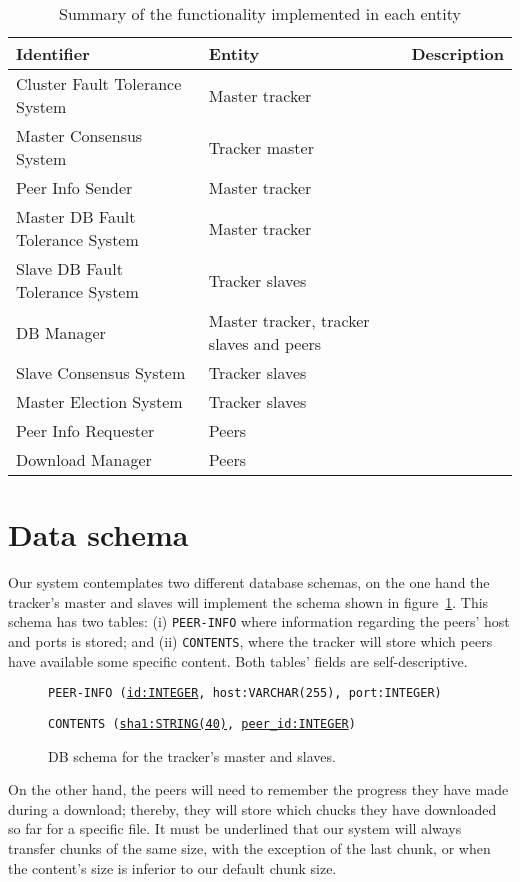 \documentclass[twoside,a4paper,10pt]{article}
\begin{document}
\begin{table}[h]
  \centering
  \begin{tabularx}{\linewidth}{X X l}
    Identifier & Entity & Description \\ \hline\hline
    Cluster Fault Tolerance System & Master tracker &  \\
    Master Consensus System & Tracker master &  \\
    Peer Info Sender & Master tracker &  \\
    Master DB Fault Tolerance System & Master tracker &  \\
    Slave DB Fault Tolerance System & Tracker slaves &  \\
    DB Manager & Master tracker, tracker slaves and peers &  \\
    Slave Consensus System & Tracker slaves &  \\
    Master Election System & Tracker slaves &  \\
    Peer Info Requester & Peers &  \\
    Download Manager & Peers &  \\
  \end{tabularx}
  \caption{\label{tab:fun-entities}Summary of the functionality
    implemented in each entity}
\end{table}
\section{Data schema}

Our system contemplates two different database schemas, on the one hand the
tracker's master and slaves will implement the schema shown in
figure~\ref{fig:schema-MS}. This schema has two tables: (i) \texttt{PEER-INFO}
where information regarding the peers' host and ports is stored; and (ii)
\texttt{CONTENTS}, where the tracker will store which peers have available some
specific content. Both tables' fields are self-descriptive.

\begin{figure}[h]
  
  \texttt{PEER-INFO (\underline{id:INTEGER}, host:VARCHAR(255), port:INTEGER)}
  
  \texttt{CONTENTS (\underline{sha1:STRING(40)}, \underline{peer\_id:INTEGER})}
  
  \centering
  \caption{\label{fig:schema-MS}DB schema for the tracker's master and slaves.}
\end{figure}

On the other hand, the peers will need to remember the
progress they have made during a download; thereby, they will store which chucks
they have downloaded so far for a specific file. It must be underlined that our
system will always transfer chunks of the same size, with the exception of the
last chunk, or when the content's size is inferior to our default chunk size.
\end{document}
